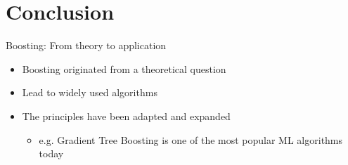 \section{Conclusion}

\begin{frame}{Boosting: From theory to application}
    \begin{itemize} \pause
        \item Boosting originated from a theoretical question \pause
        \item Lead to widely used algorithms \pause
        \item The principles have been adapted and expanded \pause
        \begin{itemize}
            \item e.g. Gradient Tree Boosting is one of the
                most popular ML algorithms today~\cite{XGBoost}
        \end{itemize} \pause
    \end{itemize}
    \centering
    \vspace{0.5cm}
    \setlength{\fboxrule}{1.5pt}
\end{frame}